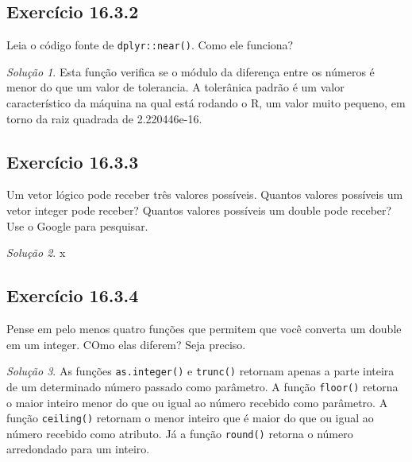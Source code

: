 \documentclass[
]{latex/krantz}
\theoremstyle{definition}
\theoremstyle{definition}
\theoremstyle{definition}
\theoremstyle{definition}
\theoremstyle{remark}
\newtheorem*{solution}{Solução}
\begin{document}
\hypertarget{exr16-3-2}{%
\subsection*{Exercício 16.3.2}\label{exr16-3-2}}

Leia o código fonte de \texttt{dplyr::near()}. Como ele funciona?

\begin{solution}
Esta função verifica se o módulo da diferença entre os números é menor do que um valor de tolerancia. A tolerânica padrão é um valor característico da máquina na qual está rodando o R, um valor muito pequeno, em torno da raiz quadrada de 2.220446e-16.
\end{solution}

\hypertarget{exr16-3-3}{%
\subsection*{Exercício 16.3.3}\label{exr16-3-3}}

Um vetor lógico pode receber três valores possíveis. Quantos valores possíveis um vetor integer pode receber? Quantos valores possíveis um double pode receber? Use o Google para pesquisar.

\begin{solution}
x
\end{solution}

\hypertarget{exr16-3-4}{%
\subsection*{Exercício 16.3.4}\label{exr16-3-4}}

Pense em pelo menos quatro funções que permitem que você converta um double em um integer. COmo elas diferem? Seja preciso.

\begin{solution}
As funções \texttt{as.integer()} e \texttt{trunc()} retornam apenas a parte inteira de um determinado número passado como parâmetro.
A função \texttt{floor()} retorna o maior inteiro menor do que ou igual ao número recebido como parâmetro.
A função \texttt{ceiling()} retornam o menor inteiro que é maior do que ou igual ao número recebido como atributo.
Já a função \texttt{round()} retorna o número arredondado para um inteiro.
\end{solution}
\end{document}
